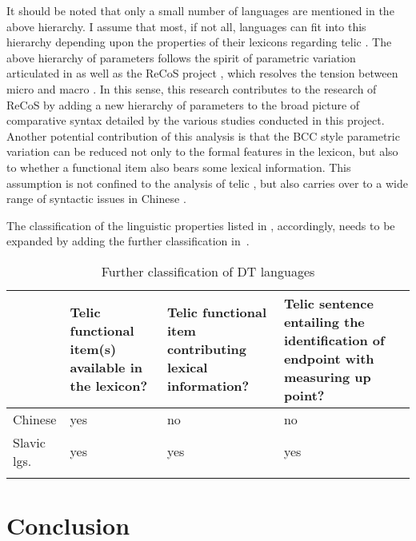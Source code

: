 \documentclass[output=paper]{langsci/langscibook}
\begin{document}
It should be noted that only a small number of languages are mentioned in the
above hierarchy. I assume that most, if not all, languages can fit into this
hierarchy depending upon the properties of their
lexicons regarding telic . The above hierarchy of
parameters follows the spirit of parametric variation articulated in
\textcite{RobHol2010} as well as the ReCoS project \citep{robertsonline}, which
resolves the tension between micro and macro . In this sense, this
research contributes to the research of ReCoS by adding a new hierarchy of
parameters to the broad picture of comparative syntax
detailed by the various studies conducted in this project.  Another potential
contribution of this analysis is that the
\gls{BCC} style parametric variation can be
reduced not only to the formal features in the lexicon, but also to whether a
functional item also bears some lexical information. This assumption is not
confined to the analysis of telic , but also carries over to a wide
range of syntactic issues in Chinese \citep[cf.][Ch.\
4]{huang2015syntactic,hu2018encoding}.


The classification of the linguistic properties listed in , accordingly,
needs to be expanded by adding the further classification in~\Cref{table:2}.

\begin{table}
{\small
\caption{Further classification of DT languages\label{table:2}}
\begin{tabularx}{\textwidth}{lQQQ}
\lsptoprule
& Telic functional item(s) available in the lexicon? & Telic functional item contributing lexical information? & Telic sentence entailing the identification of endpoint with measuring up point? \\
\midrule
Chinese & yes & no & no \\
Slavic lgs. & yes & yes & yes\\
\lspbottomrule
\end{tabularx}}
\end{table}

\section{Conclusion}\label{sec:17.6}
\end{document}
